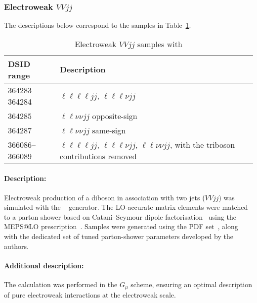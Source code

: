 



\subsubsection[Electroweak VVjj]{Electroweak $VVjj$}

The descriptions below correspond to the samples in
Table~\ref{tab:MB-sherpa-vvjj}.

\begin{table}[htbp]
  \begin{center}
    \caption{Electroweak $VVjj$ samples with \SHERPA} 
    \label{tab:MB-sherpa-vvjj}
    \begin{tabular}{ l | l }
      \hline
      DSID range & Description \\
      \hline
      364283--364284   & $\ell\ell\ell\ell jj$, $\ell\ell\ell\nu jj$\\
      364285   &  $\ell\ell\nu\nu jj$ opposite-sign\\
      364287   &  $\ell\ell\nu\nu jj$ same-sign\\
      366086--366089   &  $\ell\ell\ell\ell jj$, $\ell\ell\ell\nu jj$, $\ell\ell\nu\nu jj$, with the triboson contributions removed\\
      \hline
    \end{tabular}
  \end{center}
\end{table}

\paragraph{Description:}

Electroweak production of a diboson in association with two jets
($VVjj$) was simulated with the \SHERPA[2.2.2]~\cite{Bothmann:2019yzt}
generator. The LO-accurate matrix elements were matched to a parton
shower based on Catani--Seymour dipole factorisation~\cite{Gleisberg:2008fv,Schumann:2007mg} using the MEPS@LO
prescription~\cite{Hoeche:2011fd,Hoeche:2012yf,Catani:2001cc,Hoeche:2009rj}.
Samples were generated using the \NNPDF[3.0nnlo] PDF set~\cite{Ball:2014uwa},
along with the dedicated set of tuned parton-shower parameters
developed by the \SHERPA authors.

\paragraph{Additional description:} The calculation was performed in the
$G_\mu$ scheme, ensuring an optimal description of pure
electroweak interactions at the electroweak scale.


